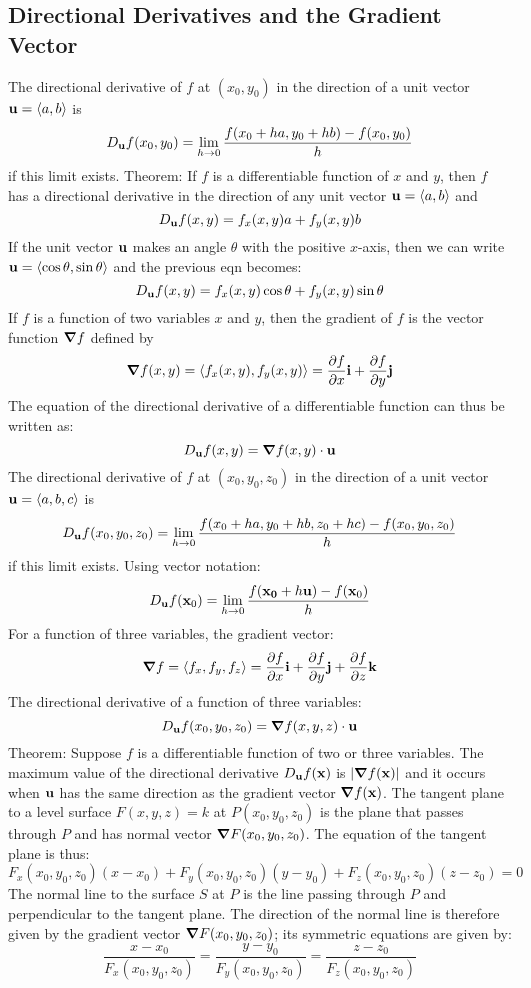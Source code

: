 \documentclass{article}
\begin{document}
    \subsection{Directional Derivatives and the Gradient Vector}
    \begin{outline}
        \1 The directional derivative of $f$ at \((x_0,y_0)\) in the direction of a unit vector \(\vb{u}=\langle a,b\rangle \) is \[D_{\vb{u}}f(x_0,y_0)=\lim_{h\to 0}\dfrac{f(x_0+ha,y_0+hb)-f(x_0,y_0)}{h}\] if this limit exists. 
        \1 Theorem: If $f$ is a differentiable function of $x$ and $y$, then $f$ has a directional derivative in the direction of any unit vector \(\vb{u}=\langle a,b\rangle\) and \[D_{\vb{u}}f(x,y)=f_x(x,y)a+f_y(x,y)b\]
            \2 If the unit vector \(\vb{u}\) makes an angle \(\theta\) with the positive $x$-axis, then we can write \(\vb{u}=\langle\cos\theta,\sin\theta\rangle\) and the previous eqn becomes: \[D_{\vb{u}}f(x,y)=f_x(x,y)\cos\theta+f_y(x,y)\sin\theta\]
        \1 If $f$ is a function of two variables $x$ and $y$, then the gradient of $f$ is the vector function \(\grad{f}\) defined by \[\grad{f(x,y)}=\langle f_x(x,y),f_y(x,y)\rangle=\pdv{f}{x}\vb{i}+\pdv{f}{y}\vb{j}\]
        \1 The equation of the directional derivative of a differentiable function can thus be written as: \[D_{\vb{u}}f(x,y)=\grad{f(x,y)}\cdot\vb{u}\]
        \1 The directional derivative of $f$ at \((x_0,y_0,z_0)\) in the direction of a unit vector \(\vb{u}=\langle a,b,c\rangle\) is \[D_{\vb{u}}f(x_0,y_0,z_0)=\lim_{h\to 0}\dfrac{f(x_0+ha,y_0+hb,z_0+hc)-f(x_0,y_0,z_0)}{h}\] if this limit exists. 
        \1 Using vector notation: \[D_{\vb{u}}f(\vb{x}_0)=\lim_{h\to 0}\dfrac{f(\vb{x_0}+h\vb{u})-f(\vb{x}_0)}{h}\]
        \1 For a function of three variables, the gradient vector: \[\grad{f}=\langle f_x,f_y,f_z\rangle=\pdv{f}{x}\vb{i}+\pdv{f}{y}\vb{j}+\pdv{f}{z}\vb{k}\]
        \1 The directional derivative of a function of three variables: \[D_{\vb{u}}f(x_0,y_0,z_0)=\grad{f(x,y,z)\cdot\vb{u}}\]
        \1 Theorem: Suppose $f$ is a differentiable function of two or three variables. The maximum value of the directional derivative \(D_{\vb{u}}f(\vb{x})\) is \(|\grad f(\vb{x})|\) and it occurs when \(\vb{u}\) has the same direction as the gradient vector \(\grad f(\vb{x})\). 
        \1 The tangent plane to a level surface \(F(x,y,z)=k\) at \(P(x_0,y_0,z_0)\) is the plane that passes through $P$ and has normal vector \(\grad F(x_0,y_0,z_0)\). The equation of the tangent plane is thus: \[F_x(x_0,y_0,z_0)(x-x_0)+F_y(x_0,y_0,z_0)(y-y_0)+F_z(x_0,y_0,z_0)(z-z_0)=0\]
        \1 The normal line to the surface $S$ at $P$ is the line passing through $P$ and perpendicular to the tangent plane. The direction of the normal line is therefore given by the gradient vector \(\grad F(x_0,y_0,z_0)\); its symmetric equations are given by: \[\dfrac{x-x_0}{F_x(x_0,y_0,z_0)}=\dfrac{y-y_0}{F_y(x_0,y_0,z_0)}=\dfrac{z-z_0}{F_z(x_0,y_0,z_0)}\]

    \end{outline}
\end{document}

